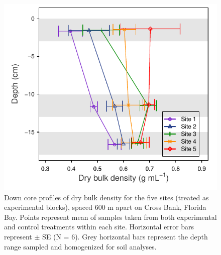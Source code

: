 \begin{figure}
  \centering
  \includegraphics[width=.95\textwidth]{Figures/chapter1/fig2}
\caption[Down core profiles of dry bulk density for the five sites (treated as experimental blocks), spaced 600 m apart on Cross Bank, Florida Bay. Points represent mean of samples taken from both experimental and control treatments within each site. Horizontal error bars represent $\pm$ SE (N = 6). Grey horizontal bars represent the depth range sampled and homogenized for soil analyses]{Down core profiles of dry bulk density for the five sites (treated as experimental blocks), spaced 600 m apart on Cross Bank, Florida Bay. Points represent mean of samples taken from both experimental and control treatments within each site. Horizontal error bars represent $\pm$ SE (N = 6). Grey horizontal bars represent the depth range sampled and homogenized for soil analyses.}
  \label{fig:1fig2}
\end{figure}

